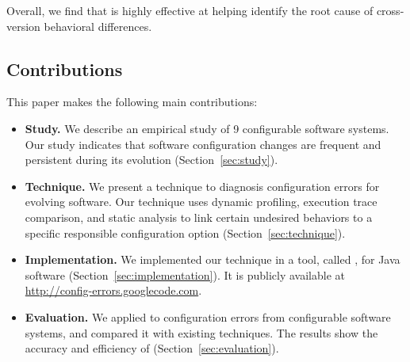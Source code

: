 Overall, we find that \ourtool is highly effective at helping
identify the root cause of cross-version behavioral differences. 

\subsection{Contributions}

This paper makes the following main contributions:

\begin{itemize}
\vspace{-3mm}
\item \textbf{Study.} We describe an empirical
study of 9 configurable software systems.
Our study indicates that software configuration changes
are frequent and persistent during its evolution (Section~\ref{sec:study}).

\item \textbf{Technique.} We present a technique to diagnosis
configuration errors for evolving software. Our technique
uses dynamic profiling, execution trace comparison, and
static analysis to link certain undesired behaviors to a
specific responsible configuration option (Section~\ref{sec:technique}).

\item \textbf{Implementation.} We implemented our technique
in a tool, called \ourtool, for Java software (Section~\ref{sec:implementation}).
It is publicly available at \url{http://config-errors.googlecode.com}.

\item \textbf{Evaluation.} We applied \ourtool to \errornum configuration
errors from \subjnum configurable software systems,
and compared it with existing techniques.
The results show the accuracy and efficiency of \ourtool (Section~\ref{sec:evaluation}).
\end{itemize}
